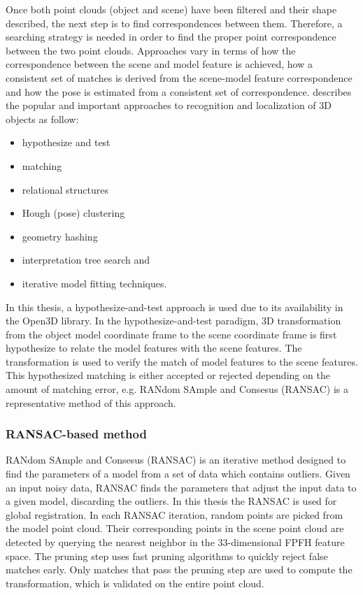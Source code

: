 Once both point clouds (object and scene) have been filtered and their shape described, the next step is to find correspondences between them. Therefore, a searching strategy is needed in order to find the proper point correspondence between the two point clouds. Approaches vary in terms of how the correspondence between the scene and model feature is achieved, how a consistent set of matches is derived from the scene-model feature correspondence and how the pose is estimated from a consistent set of correspondence. \cite{repMatching} describes the popular and important approaches to recognition and localization of 3D objects as follow: 
\begin{itemize}
    \item hypothesize and test
    \item matching
    \item relational structures
    \item Hough (pose) clustering
    \item geometry hashing
    \item interpretation tree search and
    \item iterative model fitting techniques.
\end{itemize}

In this thesis, a hypothesize-and-test approach is used due to its availability in the Open3D library. In the hypothesize-and-test paradigm, 3D transformation from the object model coordinate frame to the scene coordinate frame is first hypothesize to relate the model features with the scene features. The transformation is used to verify the match of model features to the scene features. This hypothesized matching is either accepted or rejected depending on the amount of matching error, e.g.  RANdom SAmple and Consesus (RANSAC) is a representative method of this approach.

\subsubsection{RANSAC-based method} \label{sssec:num1}

RANdom SAmple and Consesus (RANSAC)\cite{repMatching} is an iterative method designed to find the parameters of a model from a set of data which contains outliers. Given an input noisy data, RANSAC finds the parameters that adjust the input data to a given model, discarding the outliers. In this thesis the RANSAC is used for global registration. In each RANSAC iteration, random points are picked from the model point cloud. Their corresponding points in the scene point cloud are detected by querying the nearest neighbor in the 33-dimensional FPFH feature space. The pruning step uses fast pruning algorithms to quickly reject false matches early. Only matches that pass the pruning step are used to compute the transformation, which is validated on the entire point cloud. 


